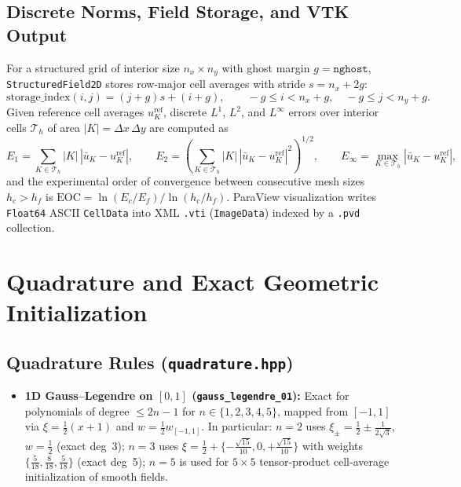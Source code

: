 \documentclass[11pt,a4paper]{article}
\theoremstyle{definition}
\newcommand{\abs}[1]{\left\lvert #1 \right\rvert}
\newcommand{\code}[1]{\texttt{#1}}
\begin{document}
\subsection{Discrete Norms, Field Storage, and VTK Output}

For a structured grid of interior size $n_x \times n_y$ with ghost margin $g = \code{nghost}$, \code{StructuredField2D} stores row-major cell averages with stride $s = n_x + 2g$:
\[
\text{storage\_index}(i,j) = (j + g)s + (i + g), \qquad -g \le i < n_x + g,\quad -g \le j < n_y + g.
\]
Given reference cell averages $u^{\mathrm{ref}}_K$, discrete $L^1$, $L^2$, and $L^\infty$ errors over interior cells $\mathcal{T}_h$ of area $|K| = \Delta x\,\Delta y$ are computed as
\[
E_1 = \sum_{K\in\mathcal{T}_h} |K|\,\abs{\bar{u}_K - u_K^{\mathrm{ref}}}, \qquad
E_2 = \left(\sum_{K\in\mathcal{T}_h} |K|\,\abs{\bar{u}_K - u_K^{\mathrm{ref}}}^2\right)^{1/2}, \qquad
E_\infty = \max_{K\in\mathcal{T}_h} \abs{\bar{u}_K - u_K^{\mathrm{ref}}},
\]
and the experimental order of convergence between consecutive mesh sizes $h_c > h_f$ is $\mathrm{EOC} = \ln(E_c/E_f) / \ln(h_c/h_f)$. ParaView visualization writes \code{Float64} ASCII \code{CellData} into XML \code{.vti} (\code{ImageData}) indexed by a \code{.pvd} collection.

\section{Quadrature and Exact Geometric Initialization}

\subsection{Quadrature Rules (\code{quadrature.hpp})}

\begin{itemize}
\item \textbf{1D Gauss--Legendre on $[0,1]$ (\code{gauss\_legendre\_01}):} Exact for polynomials of degree $\le 2n-1$ for $n \in \{1,2,3,4,5\}$, mapped from $[-1,1]$ via $\xi = \frac{1}{2}(x + 1)$ and $w = \frac{1}{2}w_{[-1,1]}$. In particular: $n=2$ uses $\xi_\pm = \frac{1}{2} \pm \frac{1}{2\sqrt{3}}$, $w=\frac{1}{2}$ (exact deg~3); $n=3$ uses $\xi = \frac{1}{2} + \{-\frac{\sqrt{15}}{10}, 0, +\frac{\sqrt{15}}{10}\}$ with weights $\{\frac{5}{18}, \frac{8}{18}, \frac{5}{18}\}$ (exact deg~5); $n=5$ is used for $5\times 5$ tensor-product cell-average initialization of smooth fields.
\end{itemize}
\end{document}
